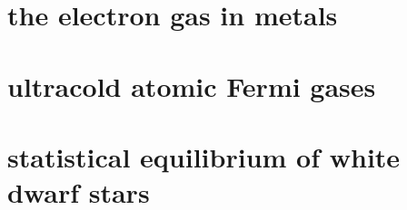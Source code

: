 \section{the electron gas in metals}

\section{ultracold atomic Fermi gases}

\section{statistical equilibrium of white dwarf stars}
